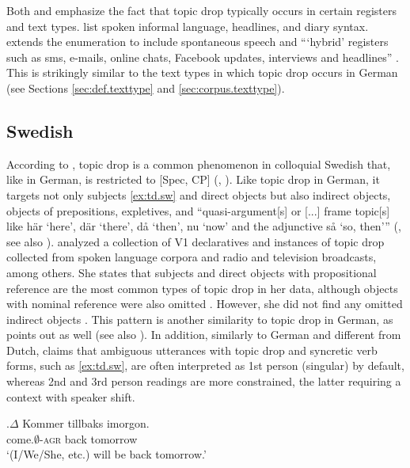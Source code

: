 Both \citet{eide.sollid2011} and \citet{nygard2014} emphasize the fact that topic drop typically occurs in certain registers and text types. 
\citet[333]{eide.sollid2011} list spoken informal language, headlines, and diary syntax.
\citet{nygard2014} extends the enumeration to include spontaneous speech and ```hybrid' registers such as sms, e-mails, online chats, Facebook updates, interviews and headlines'' \citep[172]{nygard2014}.
This is strikingly similar to the text types  in which topic drop occurs in German (see Sections \ref{sec:def.texttype} and \ref{sec:corpus.texttype}).

\subsection{Swedish} 
According to \citet[50]{hakansson1994}, topic drop is a common phenomenon in colloquial Swedish that, like in German, is restricted to [Spec, CP] (\cite[55]{mornsjo2002}, \cite[27]{platzack2013}). 
Like topic drop in German, it targets not only subjects \ref{ex:td.sw} and direct objects but also indirect objects, objects of prepositions, expletives,  and ``quasi-argument[s] or [...] frame topic[s] like här ‘here’, där ‘there’, då ‘then’, nu ‘now’ and the adjunctive så ‘so, then’'' (\cite[29]{platzack2013}, see also \cite{mornsjo2002}).
\citet[31]{mornsjo2002} analyzed a collection of V1 declaratives  and instances of topic drop collected from spoken language corpora and radio and television broadcasts, among others.
She states that subjects and direct objects with propositional reference are the most common types of topic drop in her data, although objects with nominal reference were also omitted \citep[57--58]{mornsjo2002}.
However, she did not find any omitted indirect objects \citep[62]{mornsjo2002}.
This pattern is another similarity to topic drop in German, as \citet{mornsjo2002} points out as well (see also ).
In addition, similarly to German and different from Dutch, \citet[279]{sigurdsson2011} claims that ambiguous  utterances with topic drop and syncretic  verb forms, such as \ref{ex:td.sw}, are often interpreted as 1st person (singular) by default, whereas 2nd and 3rd person readings are more constrained, the latter requiring a context with speaker shift.

\exg.\label{ex:td.sw}$\Delta$ Kommer tillbaks imorgon.\\
{} come.$\emptyset$-\textsc{agr} back tomorrow\\
`(I/We/She, etc.) will be back tomorrow.' \citep[268]{sigurdsson2011}

